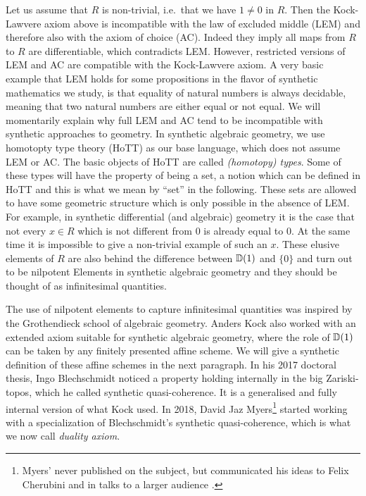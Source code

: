 Let us assume that $R$ is non-trivial, i.e.\ that we have $1\neq 0$ in $R$. Then the Kock-Lawvere axiom above is incompatible with the law of excluded middle (LEM) and therefore also with the axiom of choice (AC). Indeed they imply all maps from $R$ to $R$ are differentiable, which contradicts LEM. 
However, restricted versions of LEM and AC are compatible with the Kock-Lawvere axiom.
A very basic example that LEM holds for some propositions in the flavor of synthetic mathematics we study, is that equality of natural numbers is always decidable, meaning that two natural numbers are either equal or not equal. We will momentarily explain why full LEM and AC tend to be incompatible with synthetic approaches to geometry.
In synthetic algebraic geometry, we use homotopty type theory (HoTT) as our base language, which does not assume LEM or AC. The basic objects of HoTT are called \emph{(homotopy) types}. Some of these types will have the property of being a set, a notion which can be defined in HoTT and this is what we mean by ``set'' in the following. These sets are allowed to have some geometric structure which is only possible in the absence of LEM. For example, in synthetic differential (and algebraic) geometry it is the case that not every \(x\in R\) which is not different from \(0\) is already equal to \(0\). At the same time it is impossible to give a non-trivial example of such an \(x\). These elusive elements of \(R\) are also behind the difference between \(\mathbb{D}(1)\) and \(\{0\}\) and turn out to be nilpotent Elements in synthetic algebraic geometry and they should be thought of as infinitesimal quantities.

The use of nilpotent elements to capture infinitesimal quantities was inspired by the Grothendieck school of algebraic geometry. Anders Kock also worked with an extended axiom \cite{Kock74,kockreyes} suitable for synthetic algebraic geometry, where the role of $\mathbb{D}(1)$ can be taken by any finitely presented affine scheme. We will give a synthetic definition of these affine schemes in the next paragraph.
In his 2017 doctoral thesis, Ingo Blechschmidt noticed a property holding internally in the big Zariski-topos, which he called synthetic quasi-coherence. It is a generalised and fully internal version of what Kock used. In 2018, David Jaz Myers\footnote{Myers' never published on the subject, but communicated his ideas to Felix Cherubini and in talks to a larger audience \cite{myers-talk1,myers-talk2}.} started working with a specialization of Blechschmidt's synthetic quasi-coherence, which is what we now call \emph{duality axiom}.

